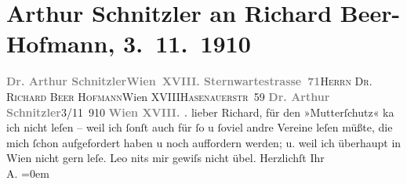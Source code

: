 

         
         \renewcommand{\erwaehntePersonen}{Personen: Richard Beer-Hofmann, Leo Van-Jung}
         \renewcommand{\erwaehnteInstitutionen}{Institutionen: Bund für Mutterschutz}
         \renewcommand{\erwaehnteOrte}{Orte: Edmund-Weiß-Gasse, Hasenauerstraße, Sternwartestraße, Wien, XVIII., Währing}
         \renewcommand{\erwaehnteWerke}{}
               \section[Arthur Schnitzler an Richard Beer-Hofmann, 3. 11. 1910]{ Arthur Schnitzler an Richard Beer-Hofmann, 3. 11. 1910}\nopagebreak{}\rehead{ }\begin{ledgroupsized}[t]{13cm}\normalsize\beginnumbering \toendnotes[C]{\smallbreak\pagebreak[2]} 
\toendnotes[C]{\smallbreak}\pstart{}{\pb}\textcolor{gray}{\textbf{Dr. Arthur Schnitzler}}\pend{}\pstart{}\textcolor{gray}{\textbf{Wien XVIII. Sternwartestrasse 71}}\pend{}{\bigskip}\pstart{}{\pb}\textsc{Herrn Dr. Richard Beer Hofmann}\pend{}\pstart{}Wien XVIII\pend{}\pstart{}\textsc{Hasenauerstr 59}\pend{}{\bigskip}\pstart
           \noindent{}{\pb}\textcolor{gray}{\textbf{Dr. Arthur Schnitzler}}\hfill 3/11 910\pend
           \pstart
           \textcolor{gray}{\textbf{Wien XVIII. \label{K_L01977-1v}\label{K_L01977-1h}.}}\pend
           \pstart{}lieber Richard, \pend\pstart
           für den »Mutterſchutz« ka{\geminationn} ich nicht leſen – weil ich ſonſt auch für ſo u ſoviel
               andre Vereine leſen müßte, {\pb}die mich ſchon
               aufgefordert haben u noch auffordern werden; u. weil ich überhaupt in Wien nicht gern leſe.\pend
           \pstart
           Leo ni{\geminationm}ts mir
               gewiſs nicht übel.\pend
           \pstart
           {\pb}Herzlichſt Ihr{\\[\baselineskip]}\spacefill\mbox{A.}\pend
           \leftskip=0em{}
         
         \endnumbering{}\end{ledgroupsized}  \newcommand{\dateiname}{L01977}\newcommand{\titel}{Arthur Schnitzler an Richard Beer-Hofmann, 3. 11. 1910}\newcommand{\editorInnen}{Martin Anton Müller und Gerd-Hermann Susen}
      